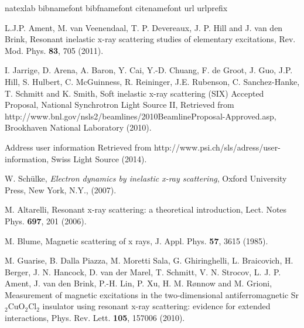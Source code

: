 \documentclass[twocolumn,prb,twocolumn,amsmath,superscriptaddress,nofootinbib,amssymb]{revtex4-1}
\begin{document}
\begin{thebibliography}{63}
\expandafter\ifx\csname natexlab\endcsname\relax\def\natexlab#1{#1}\fi
\expandafter\ifx\csname bibnamefont\endcsname\relax
  \def\bibnamefont#1{#1}\fi
\expandafter\ifx\csname bibfnamefont\endcsname\relax
  \def\bibfnamefont#1{#1}\fi
\expandafter\ifx\csname citenamefont\endcsname\relax
  \def\citenamefont#1{#1}\fi
\expandafter\ifx\csname url\endcsname\relax
  \def\url#1{\texttt{#1}}\fi
\expandafter\ifx\csname urlprefix\endcsname\relax\def\urlprefix{URL }\fi
\providecommand{\bibinfo}[2]{#2}
\providecommand{\eprint}[2][]{\url{#2}}


L.J.P. Ament, M. van Veenendaal, T. P. Devereaux, J. P. Hill and J. van den Brink,
Resonant inelastic x-ray scattering studies of elementary excitations,
Rev. Mod. Phys. {\bf 83}, 705 (2011).

I. Jarrige, D. Arena, A. Baron, Y. Cai, Y.-D. Chuang, F. de Groot, J. Guo,
J.P. Hill, S. Hulbert, C. McGuinness, R. Reininger, J.E. Rubenson, C. Sanchez-Hanke, T. Schmitt and K. Smith,
Soft inelastic x-ray scattering (SIX)
Accepted Proposal, National Synchrotron Light Source II,
Retrieved from http://www.bnl.gov/nsls2/beamlines/2010BeamlineProposal-Approved.asp,
Brookhaven National Laboratory (2010).

Address user information
Retrieved from http://www.psi.ch/sls/adress/user-information, Swiss Light Source (2014).

W. Sch\"{u}lke,
\textit{Electron dynamics by inelastic x-ray scattering},
Oxford University Press, New York, N.Y., (2007).

M. Altarelli,
Resonant x-ray scattering: a theoretical introduction,
Lect. Notes Phys. {\bf697}, 201 (2006).

M. Blume,
Magnetic scattering of x rays,
J. Appl. Phys. {\bf 57}, 3615 (1985).

M. Guarise, B. Dalla Piazza, M. Moretti Sala, G. Ghiringhelli, L. Braicovich, H. Berger, J. N. Hancock, D. van der Marel, T. Schmitt, V. N. Strocov, L. J. P. Ament, J. van den Brink, P.-H. Lin, P. Xu, H. M. R{\o}nnow and M. Grioni,
Measurement of magnetic excitations in the two-dimensional antiferromagnetic Sr$_2$CuO$_2$Cl$_2$ insulator using resonant x-ray scattering: evidence for extended interactions,
Phys. Rev. Lett. {\bf105}, 157006 (2010).


\end{thebibliography}
\end{document}
